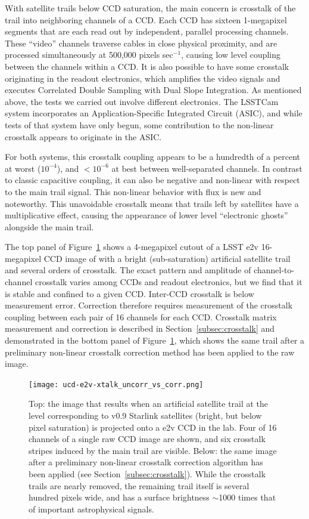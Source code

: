 \documentclass[twocolumn,trackchanges]{aastex63}
\begin{document}
With satellite trails below CCD saturation, the main concern is crosstalk of the trail into neighboring channels of a CCD. Each CCD has sixteen 1-megapixel segments that are each read out by independent, parallel processing channels. These ``video'' channels traverse cables in close physical proximity, and are processed simultaneously at 500,000 pixels sec$^{-1}$, causing low level coupling between the channels within a CCD. It is also possible to have some crosstalk originating in the readout electronics, which amplifies the video signals and executes Correlated Double Sampling with Dual Slope Integration.
As mentioned above, the tests we carried out involve different electronics. The LSSTCam system incorporates an Application-Specific Integrated Circuit (ASIC), and while tests of that system have only begun, some contribution to the non-linear crosstalk appears to originate in the ASIC.

For both systems, this crosstalk coupling appears to be a hundredth of a percent at worst ($10^{-4}$), and $<10^{-6}$ at best between well-separated channels. In contrast to classic capacitive coupling, it can also be negative and non-linear with respect to the main trail signal. This non-linear behavior with flux is new and noteworthy. This unavoidable crosstalk means that trails left by satellites have a multiplicative effect, causing the appearance of lower level ``electronic ghosts'' alongside the main trail.

The top panel of Figure~\ref{fig:xtalk} shows a 4-megapixel cutout of a LSST e2v 16-megapixel CCD image of with a bright (sub-saturation) artificial satellite trail and several orders of crosstalk. The exact pattern and amplitude of channel-to-channel crosstalk varies among CCDs and readout electronics, but we find that it is stable and confined to a given CCD. Inter-CCD crosstalk is below measurement error. Correction therefore requires measurement of the crosstalk coupling between each pair of 16 channels for each CCD. Crosstalk matrix measurement and correction is described in Section~\ref{subsec:crosstalk} and demonstrated in the bottom panel of Figure~\ref{fig:xtalk}, which shows the same trail after a preliminary non-linear crosstalk correction method has been applied to the raw image.

\begin{figure}[ht!]
\texttt{[image: ucd-e2v-xtalk\_uncorr\_vs\_corr.png]}
\caption{Top: the image that results when an artificial satellite trail at the level corresponding to v0.9 Starlink satellites (bright, but below pixel saturation) is projected onto a e2v CCD in the lab. Four of 16 channels of a single raw CCD image are shown, and six crosstalk stripes induced by the main trail are visible. Below: the same image after a preliminary non-linear crosstalk correction algorithm has been applied (see Section~\ref{subsec:crosstalk}). While the crosstalk trails are nearly removed, the remaining trail itself is several hundred pixels wide, and has a surface brightness $\sim$1000 times that of important astrophysical signals. \label{fig:xtalk}}
\end{figure}
\end{document}
